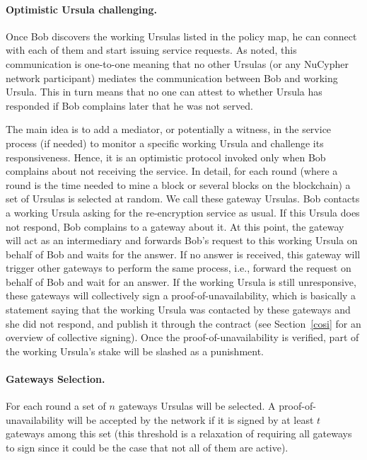 \paragraph{\bf Optimistic Ursula challenging.} 
Once Bob discovers the working Ursulas listed in the policy map, he can connect with each of them and start issuing service requests. As noted, this communication is one-to-one meaning that no other Ursulas (or any 
NuCypher network participant) mediates the communication between Bob and working  
Ursula. This in turn means that no one can attest to whether Ursula has responded if Bob 
complains later that he was not served.


The main idea is to add a mediator, or potentially a witness, in the service process (if needed) to monitor a specific working Ursula and challenge its responsiveness. Hence, it is an optimistic protocol invoked only when Bob complains about not receiving the service. In detail, for each round (where a 
round is the time needed to mine a block or several blocks on the blockchain) a set of Ursulas is selected at random. We call these gateway Ursulas. Bob contacts a working Ursula asking for the re-encryption service as usual. If this Ursula does not respond, Bob complains to a gateway about it. At this point, the gateway will act as an intermediary and forwards Bob's request to this working Ursula on behalf of Bob and waits for the answer. If no answer is received, this gateway will trigger other gateways to perform the same process, i.e., forward the request on behalf of Bob and wait for an answer. If the working 
Ursula is still unresponsive, these gateways will collectively sign a proof-of-unavailability, which is basically a statement saying that the working Ursula was contacted by these gateways and she did not respond, and publish it through the \stakeescrow contract (see Section~\ref{cosi} for an overview of collective signing). Once the proof-of-unavailability is verified, part of the working Ursula's stake will be slashed as a punishment. 


\paragraph{\bf Gateways Selection.} 
For each round a set of $n$ gateways Ursulas will be selected. A proof-of-unavailability will be accepted by the network if it is signed by at least $t$ gateways among this set (this threshold is a relaxation of requiring all gateways to sign since it could be the case that not all of them are active). 


